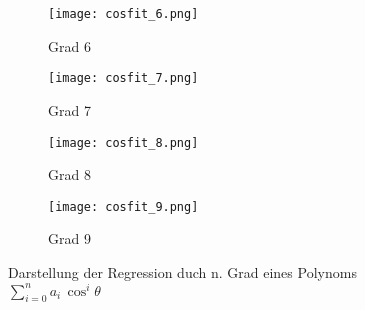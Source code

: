 \documentclass[12pt]{article}
\begin{document}
\begin{figure}[H]\hspace*{-1.5cm}
    \begin{subfigure}{0.4\textwidth}
    \texttt{[image: cosfit\_6.png]}
    \caption{Grad 6}
    \end{subfigure}
    \hfill
    \begin{subfigure}{0.4\textwidth}
    \hspace*{-0.8cm}
    \texttt{[image: cosfit\_7.png]}
    \caption{Grad 7}
    \end{subfigure}
    \hfill
    \hspace*{-1.5cm}
    \begin{subfigure}{0.4\textwidth}
    \texttt{[image: cosfit\_8.png]}
    \caption{Grad 8}
    \end{subfigure}
    \hfill
    \begin{subfigure}{0.4\textwidth}
        \hspace*{-0.8cm}
        \texttt{[image: cosfit\_9.png]}
        \caption{Grad 9}
        \end{subfigure}
        \hfill
    \caption{Darstellung der Regression duch n. Grad eines Polynoms $\sum_{i=0}^na_i\,\cos^i\theta$}
\end{figure}
\end{document}
